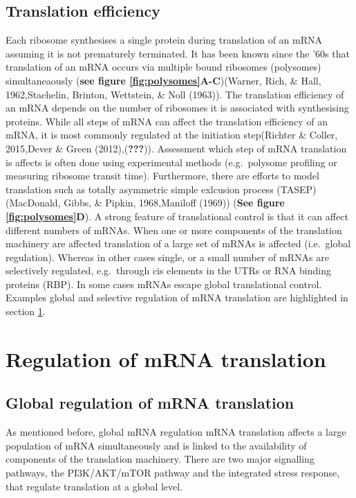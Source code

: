 \documentclass[12pt,openany]{book}
\begin{document}
\subsection{Translation efficiency}

Each ribosome synthesises a single protein during translation of an mRNA
assuming it is not prematurely terminated. It has been known since the
'60s that translation of an mRNA occurs via multiple bound ribosomes
(polysomes) simultaneaously (\textbf{see figure
\ref{fig:polysomes}A-C})(Warner, Rich, \& Hall, 1962,Staehelin, Brinton,
Wettstein, \& Noll (1963)). The translation efficiency of an mRNA
depends on the number of ribosomes it is associated with synthesising
proteins. While all steps of mRNA can affect the translation efficiency
of an mRNA, it is most commonly regulated at the initiation step(Richter
\& Coller, 2015,Dever \& Green (2012),({\textbf{???}})). Assessment
which step of mRNA translation is affects is often done using
experimental methods (e.g.~polysome profiling or measuring ribosome
transit time). Furthermore, there are efforts to model translation such
as totally asymmetric simple exlcusion process (TASEP) (MacDonald,
Gibbs, \& Pipkin, 1968,Maniloff (1969)) (\textbf{See figure
\ref{fig:polysomes}D}). A strong feature of translational control is
that it can affect different numbers of mRNAs. When one or more
components of the translation machinery are affected translation of a
large set of mRNAs is affected (i.e.~global regulation). Whereas in
other cases single, or a small number of mRNAs are selectively
regulated, e.g.~through cis elements in the UTRs or RNA binding proteins
(RBP). In some cases mRNAs escape global translational control. Examples
global and selective regulation of mRNA translation are highlighted in
section \ref{regmRNA}.

\section{Regulation of mRNA translation} \label{regmRNA}

\subsection{Global regulation of mRNA translation}

As mentioned before, global mRNA regulation mRNA translation affects a
large population of mRNA simultaneously and is linked to the
availability of components of the translation machinery. There are two
major signalling pathways, the PI3K/AKT/mTOR pathway and the integrated
stress response, that regulate translation at a global level.
\end{document}
